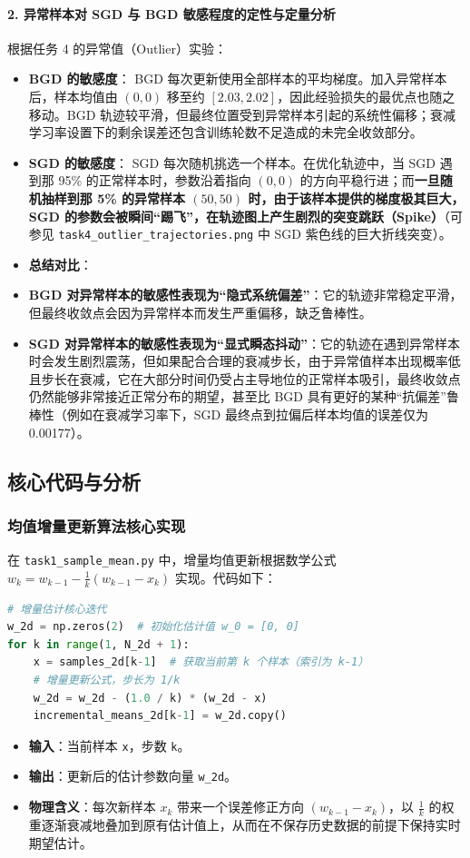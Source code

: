 \documentclass[11pt,a4paper,UTF8]{ctexart}
\numberwithin{figure}{section}
\numberwithin{table}{section}
\begin{document}
\paragraph{2. 异常样本对 SGD 与 BGD 敏感程度的定性与定量分析}
根据任务 4 的异常值（Outlier）实验：
\begin{itemize}
\item \textbf{BGD 的敏感度}：
  BGD 每次更新使用全部样本的平均梯度。加入异常样本后，样本均值由 $(0,0)$ 移至约 $[2.03,2.02]$，因此经验损失的最优点也随之移动。BGD 轨迹较平滑，但最终位置受到异常样本引起的系统性偏移；衰减学习率设置下的剩余误差还包含训练轮数不足造成的未完全收敛部分。
\item \textbf{SGD 的敏感度}：
  SGD 每次随机挑选一个样本。在优化轨迹中，当 SGD 遇到那 95\% 的正常样本时，参数沿着指向 $(0,0)$ 的方向平稳行进；而\textbf{一旦随机抽样到那 5\% 的异常样本 $(50,50)$ 时，由于该样本提供的梯度极其巨大，SGD 的参数会被瞬间“踢飞”，在轨迹图上产生剧烈的突变跳跃（Spike）}（可参见 \texttt{task4\_outlier\_trajectories.png} 中 SGD 紫色线的巨大折线突变）。
\item \textbf{总结对比}：
\item \textbf{BGD 对异常样本的敏感性表现为“隐式系统偏差”}：它的轨迹非常稳定平滑，但最终收敛点会因为异常样本而发生严重偏移，缺乏鲁棒性。
\item \textbf{SGD 对异常样本的敏感性表现为“显式瞬态抖动”}：它的轨迹在遇到异常样本时会发生剧烈震荡，但如果配合合理的衰减步长，由于异常值样本出现概率低且步长在衰减，它在大部分时间仍受占主导地位的正常样本吸引，最终收敛点仍然能够非常接近正常分布的期望，甚至比 BGD 具有更好的某种“抗偏差”鲁棒性（例如在衰减学习率下，SGD 最终点到拉偏后样本均值的误差仅为 0.00177）。
\end{itemize}

\subsection{核心代码与分析}

\subsubsection{均值增量更新算法核心实现}
在 \texttt{task1\_sample\_mean.py} 中，增量均值更新根据数学公式 $w_k = w_{k-1} - \frac{1}{k}(w_{k-1} - x_k)$ 实现。代码如下：

\begin{lstlisting}[language=python]
# 增量估计核心迭代
w_2d = np.zeros(2)  # 初始化估计值 w_0 = [0, 0]
for k in range(1, N_2d + 1):
    x = samples_2d[k-1]  # 获取当前第 k 个样本（索引为 k-1）
    # 增量更新公式，步长为 1/k
    w_2d = w_2d - (1.0 / k) * (w_2d - x)
    incremental_means_2d[k-1] = w_2d.copy()
\end{lstlisting}
\begin{itemize}
\item \textbf{输入}：当前样本 \texttt{x}，步数 \texttt{k}。
\item \textbf{输出}：更新后的估计参数向量 \texttt{w\_2d}。
\item \textbf{物理含义}：每次新样本 $x_k$ 带来一个误差修正方向 $(w_{k-1} - x_k)$，以 $\frac{1}{k}$ 的权重逐渐衰减地叠加到原有估计值上，从而在不保存历史数据的前提下保持实时期望估计。
\end{itemize}
\end{document}
